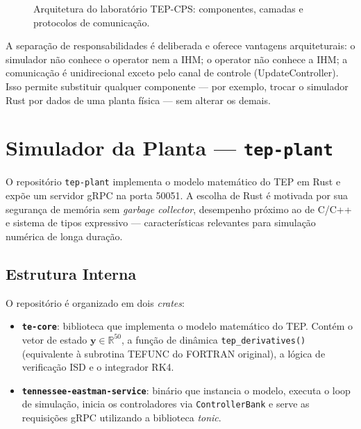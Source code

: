 \begin{figure}[htbp]
\centering
{}
\caption{Arquitetura do laboratório TEP-CPS: componentes, camadas e protocolos de comunicação.}
\label{fig:arch_overview}
\end{figure}

A separação de responsabilidades é deliberada e oferece vantagens arquiteturais: o simulador não conhece o operator nem a IHM; o operator não conhece a IHM; a comunicação é unidirecional exceto pelo canal de controle (UpdateController). Isso permite substituir qualquer componente — por exemplo, trocar o simulador Rust por dados de uma planta física — sem alterar os demais.

\section{Simulador da Planta — \texttt{tep-plant}}
\label{sec:plant}

O repositório \texttt{tep-plant} implementa o modelo matemático do TEP em Rust e expõe um servidor gRPC na porta 50051. A escolha de Rust é motivada por sua segurança de memória sem \textit{garbage collector}, desempenho próximo ao de C/C++ e sistema de tipos expressivo — características relevantes para simulação numérica de longa duração.

\subsection{Estrutura Interna}

O repositório é organizado em dois \textit{crates}:

\begin{itemize}
  \item \textbf{\texttt{te-core}}: biblioteca que implementa o modelo matemático do TEP. Contém o vetor de estado $\mathbf{y} \in \mathbb{R}^{50}$, a função de dinâmica \texttt{tep\_derivatives()} (equivalente à subrotina TEFUNC do FORTRAN original), a lógica de verificação ISD e o integrador RK4.
  \item \textbf{\texttt{tennessee-eastman-service}}: binário que instancia o modelo, executa o loop de simulação, inicia os controladores via \texttt{ControllerBank} e serve as requisições gRPC utilizando a biblioteca \textit{tonic}.
\end{itemize}

